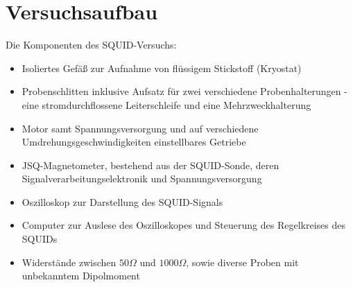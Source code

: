 \documentclass[12pt]{article}
\begin{document}
\section{Versuchsaufbau}
Die Komponenten des SQUID-Versuchs:
\begin{itemize}
 \item Isoliertes Gefäß zur Aufnahme von flüssigem Stickstoff (Kryostat)
 \item Probenschlitten inklusive Aufsatz für zwei verschiedene Probenhalterungen - eine stromdurchflossene Leiterschleife und eine Mehrzweckhalterung
 \item Motor samt Spannungsversorgung und auf verschiedene Umdrehungsgeschwindigkeiten einstellbares Getriebe
 \item JSQ-Magnetometer, bestehend aus der SQUID-Sonde, deren Signalverarbeitungselektronik und Spannungsversorgung
 \item Oszilloskop zur Darstellung des SQUID-Signals
 \item Computer zur Auslese des Oszilloskopes und Steuerung des Regelkreises des SQUIDs
 \item Widerstände zwischen $50\Omega$ und $1000\Omega$, sowie diverse Proben mit unbekanntem Dipolmoment
\end{itemize}
\end{document}

